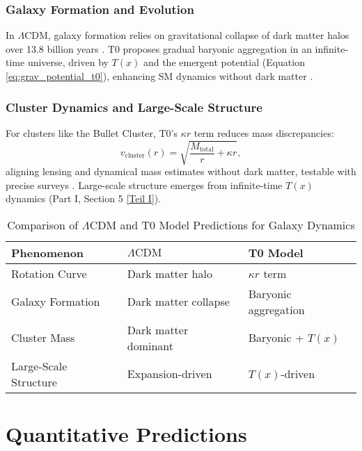 \documentclass[twocolumn,aps,prl]{revtex4-2}
\newcommand{\Tfield}{T(x)}
\newcommand{\LCDM}{\Lambda\text{CDM}}
\begin{document}
	\subsubsection{Galaxy Formation and Evolution}
	In \(\LCDM\), galaxy formation relies on gravitational collapse of dark matter halos over 13.8 billion years \cite{Planck2020}. T0 proposes gradual baryonic aggregation in an infinite-time universe, driven by \(\Tfield\) and the emergent potential (Equation \ref{eq:grav_potential_t0}), enhancing SM dynamics without dark matter \cite{pascher_galaxies_2025}.
	
	\subsubsection{Cluster Dynamics and Large-Scale Structure}
	For clusters like the Bullet Cluster, T0's \(\kappa r\) term reduces mass discrepancies:
	\begin{equation}
		v_{\text{cluster}}(r) = \sqrt{\frac{M_{\text{total}}}{r} + \kappa r},
		\label{eq:cluster_velocity}
	\end{equation}
	aligning lensing and dynamical mass estimates without dark matter, testable with precise surveys \cite{pascher_emergente_2025}. Large-scale structure emerges from infinite-time \(\Tfield\) dynamics (Part I, Section 5 \href{https://github.com/jpascher/T0-Time-Mass-Duality/tree/main/2/pdf/English/QMRelTimeMassPart1En.pdf}{[Teil I]}).
	
	\begin{table}[ht]
		\centering
		\caption{Comparison of \(\LCDM\) and T0 Model Predictions for Galaxy Dynamics}
		\label{tab:galaxy_dynamics_comparison}
		\small
		\begin{tabular}{p{} p{} p{}}
			\hline
			\textbf{Phenomenon} & \textbf{\(\LCDM\)} & \textbf{T0 Model} \\
			\hline
			Rotation Curve & Dark matter halo & \(\kappa r\) term \\
			Galaxy Formation & Dark matter collapse & Baryonic aggregation \\
			Cluster Mass & Dark matter dominant & Baryonic + \(\Tfield\) \\
			Large-Scale Structure & Expansion-driven & \(\Tfield\)-driven \\
			\hline
		\end{tabular}
	\end{table}
	
	\section{Quantitative Predictions}
	\label{sec:predictions}
	
\end{document}
